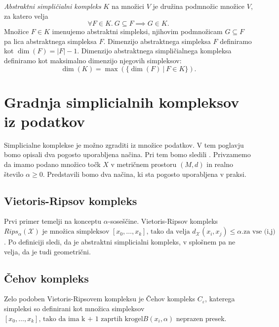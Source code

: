 \begin{definicija}
    \textit{Abstraktni simpli\v{c}ialni kompleks} \(K\) na množici \(V\) je družina podmnožic množice \(V\), za katero velja
\[
\forall F \in K. \ G \subseteq F \implies G \in K.
\]
Množice \(F \in K\) imenujemo abstraktni simpleksi, njihovim podmnožicam \(G \subseteq F\) pa lica abstraktnega simpleksa \(F\). Dimenzijo abstraktnega simpleksa \(F\) definiramo kot \(\dim(F) = |F| - 1\). Dimenzijo abstraktnega simpli\v{c}ialnega kompleksa definiramo kot maksimalno dimenzijo njegovih simpleksov:
\[
\dim(K) = \max(\{\dim(F) \ | \ F \in K\}).
\]
\end{definicija}


\section{Gradnja simplicialnih kompleksov iz podatkov}
Simplicialne komplekse je možno zgraditi iz množice podatkov. V tem poglavju bomo opisali dva pogosto uporabljena načina. Pri tem bomo sledili \cite{10.1007/978-3-319-45378-1_1}. Privzamemo da imamo podano množico točk $X$ v metričnem prostoru $(M, d)$ in realno število $\alpha \geq 0$. Predstavili bomo dva načina, ki sta pogosto uporabljena v praksi. \cite{kun2015cech}

\subsection{Vietoris-Ripsov kompleks}
Prvi primer temelji na konceptu $\alpha$-soseščine. Vietoris-Ripsov kompleks $Rips_{\alpha}(\mathcal{X}) \text{ je množica simpleksov } [x_0, \ldots, x_k] \text{, tako da velja } d_{\mathcal{X}}(x_i, x_j) \leq \alpha. \text{za vse (i,j)}$. Po definiciji sledi, da je abstraktni simplicialni kompleks, v splošnem pa ne velja, da je tudi geometrični.

\subsection{Čehov kompleks}
Zelo podoben Vietoris-Ripsovem kompleksu je Čehov kompleks $C_\varepsilon$, katerega simpleksi so definirani kot množica simpleksov $[x_0, \ldots, x_k] \text{, tako da ima k + 1 zaprtih krogel} B(x_i, \alpha)$ neprazen presek.

